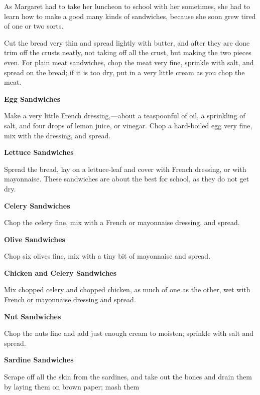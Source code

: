 \documentclass[11pt]{book}
\newcommand{\indpar}{\par\noindent\hspace*{\parindent}}
\newcommand{\instruction}{\indpar}
\newenvironment{RecipeTitle}{\medskip\begin{center}\large\bf }{\end{center}\smallskip}
\begin{document}
\indpar
  As Margaret had to take her luncheon to school with her
sometimes, she had to learn how to make a good many kinds of
sandwiches, because she soon grew tired of one or two sorts.
\medskip
\instruction  Cut the bread very thin and spread lightly with butter,
and after they are done trim off the crusts neatly, not taking
off all the crust, but making the two pieces even.  For plain
meat sandwiches, chop the meat very fine, sprinkle with salt,
and spread on the bread; if it is too dry, put in a very little
cream as you chop the meat.
\begin{RecipeTitle}
Egg Sandwiches\label{egg_sandwiches}
\end{RecipeTitle}
\instruction  Make a very little French dressing,---about a teaspoonful
of oil, a sprinkling of salt, and four drops of lemon juice,
or vinegar.  Chop a hard-boiled egg very fine, mix with the
dressing, and spread.
\begin{RecipeTitle}
Lettuce Sandwiches\label{lettuce_sandwiches}
\end{RecipeTitle}
\instruction  Spread the bread, lay on a lettuce-leaf and cover with French
dressing, or with mayonnaise.  These sandwiches are about the
best for school, as they do not get dry.
\begin{RecipeTitle}
Celery Sandwiches\label{celery_sandwiches}
\end{RecipeTitle}
\instruction  Chop the celery fine, mix with a French or mayonnaise
dressing, and spread.
\begin{RecipeTitle}
Olive Sandwiches\label{olive_sandwiches}
\end{RecipeTitle}
\instruction  Chop six olives fine, mix with a tiny bit of mayonnaise
and spread.\pagebreak[4]
\begin{RecipeTitle}
Chicken and Celery Sandwiches\label{chicken_and_celery_sandwiches}
\end{RecipeTitle}
\instruction  Mix chopped celery and chopped chicken, as much of one
as the other, wet with French or mayonnaise dressing and spread.
\begin{RecipeTitle}
Nut Sandwiches\label{nut_sandwiches}
\end{RecipeTitle}
\instruction  Chop the nuts fine and add just enough cream to moisten;
sprinkle with salt and spread.
\begin{RecipeTitle}
Sardine Sandwiches\label{sardine_sandwiches}
\end{RecipeTitle}
\instruction  Scrape off all the skin from the sardines, and take out the
bones and drain them by laying them on brown paper; mash them
\end{document}
